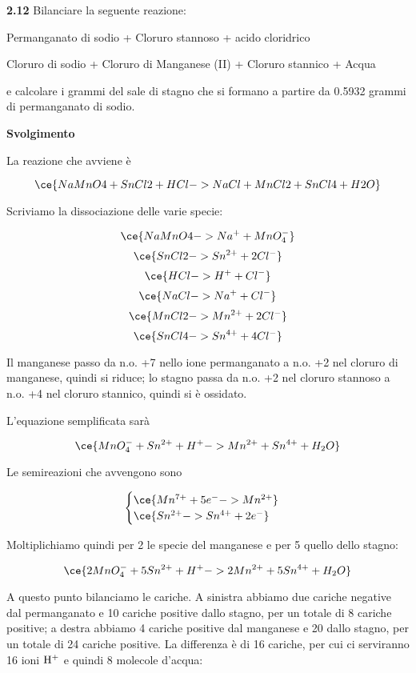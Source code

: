 \vspace{0.2cm}\textbf{2.12} Bilanciare la seguente reazione:

\begin{center}
    Permanganato di sodio + Cloruro stannoso + acido cloridrico \ce{->}

    \ce{->} Cloruro di sodio + Cloruro di Manganese (II) + Cloruro stannico + Acqua
\end{center}

e calcolare i grammi del sale di stagno che si formano a partire da 0.5932 grammi di permanganato di sodio.

\vspace{0.2cm}\large\textbf{Svolgimento}\normalsize

\vspace{0.2cm}La reazione che avviene è

$$\ce{NaMnO4 + SnCl2 + HCl -> NaCl + MnCl2 + SnCl4 + H2O}$$

Scriviamo la dissociazione delle varie specie:

$$\ce{NaMnO4 -> Na^+ + MnO_4^-}$$
$$\ce{SnCl2 -> Sn^{2+} + 2Cl^-}$$
$$\ce{HCl -> H^+ + Cl^-}$$
$$\ce{NaCl -> Na^+ + Cl^-}$$
$$\ce{MnCl2 -> Mn^{2+} + 2Cl^-}$$
$$\ce{SnCl4 -> Sn^{4+} + 4Cl^-}$$

Il manganese passo da n.o. +7 nello ione permanganato a n.o. +2 nel cloruro di
manganese, quindi si riduce; lo stagno passa da n.o. +2 nel cloruro stannoso a n.o. +4 nel cloruro stannico, quindi si è ossidato.

L'equazione semplificata sarà

$$\ce{MnO_4^- + Sn^{2+} + H^+ -> Mn^{2+} + Sn^{4+} + H_2O}$$

Le semireazioni che avvengono sono

$$\begin{cases}
    \ce{Mn^{7+} + 5e^- -> Mn^{2+}}\\
    \ce{Sn^{2+} -> Sn^{4+} + 2e^-}
\end{cases}$$

Moltiplichiamo quindi per 2 le specie del manganese e per 5 quello dello stagno:

$$\ce{2MnO_4^- + 5Sn^{2+} + H^+ -> 2Mn^{2+} + 5Sn^{4+} + H_2O}$$

A questo punto bilanciamo le cariche. A sinistra abbiamo due cariche negative dal permanganato e 10 cariche positive dallo stagno, per un totale di 8 cariche positive; a destra abbiamo 4 cariche positive dal manganese e 20 dallo stagno, per un totale di 24 cariche positive. La differenza è di 16 cariche, per cui ci serviranno 16 ioni $\rm H^+$ e quindi 8 molecole d'acqua: 

